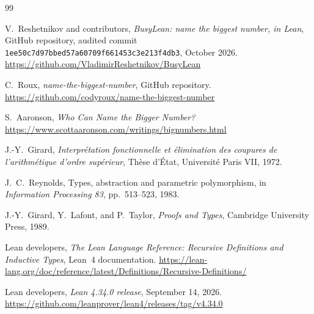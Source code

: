 \documentclass[11pt]{article}
\theoremstyle{definition}
\theoremstyle{remark}
\begin{document}
\begin{thebibliography}{99}

V.~Reshetnikov and contributors,
\emph{BusyLean: name the biggest number, in Lean},
GitHub repository, audited commit
\texttt{1ee50c7d97bbed57a60709f661453c3e213f4db3}, October 2026.
\url{https://github.com/VladimirReshetnikov/BusyLean}

C.~Roux,
\emph{name-the-biggest-number},
GitHub repository.
\url{https://github.com/codyroux/name-the-biggest-number}

S.~Aaronson,
\emph{Who Can Name the Bigger Number?}
\url{https://www.scottaaronson.com/writings/bignumbers.html}

J.-Y.~Girard,
\emph{Interpr\'etation fonctionnelle et \'elimination des coupures de
l'arithm\'etique d'ordre sup\'erieur},
Th\`ese d'\'Etat, Universit\'e Paris VII, 1972.

J.~C.~Reynolds,
Types, abstraction and parametric polymorphism,
in \emph{Information Processing 83}, pp.~513--523, 1983.

J.-Y.~Girard, Y.~Lafont, and P.~Taylor,
\emph{Proofs and Types},
Cambridge University Press, 1989.

Lean developers,
\emph{The Lean Language Reference: Recursive Definitions and Inductive Types},
Lean~4 documentation.
\url{https://lean-lang.org/doc/reference/latest/Definitions/Recursive-Definitions/}

Lean developers,
\emph{Lean 4.34.0 release}, September 14, 2026.
\url{https://github.com/leanprover/lean4/releases/tag/v4.34.0}

\end{thebibliography}
\end{document}
